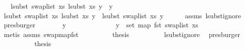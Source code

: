 \begin{isabellebody}
\ \ \ {\isachardoublequoteopen}lsubst\ {\isacharparenleft}{\kern0pt}swap{\isacharunderscore}{\kern0pt}list\ xs{\isacharparenright}{\kern0pt}\ {\isacharparenleft}{\kern0pt}lsubst\ xs\ y{\isacharparenright}{\kern0pt}\ {\isacharequal}{\kern0pt}\ y{\isachardoublequoteclose}\isanewline
%
\isadelimproof
%
\endisadelimproof
%
\isatagproof
{}\isamarkupfalse%
\ {\isacharminus}{\kern0pt}\isanewline
\ \ \isamarkupfalse%
\ {\isachardoublequoteopen}lsubst\ {\isacharparenleft}{\kern0pt}swap{\isacharunderscore}{\kern0pt}list\ xs{\isacharparenright}{\kern0pt}\ {\isacharparenleft}{\kern0pt}lsubst\ xs\ y{\isacharparenright}{\kern0pt}\ {\isacharequal}{\kern0pt}\ lsubst\ {\isacharparenleft}{\kern0pt}swap{\isacharunderscore}{\kern0pt}list\ xs{\isacharparenright}{\kern0pt}\ y{\isachardoublequoteclose}\isanewline
\ \ \ \ \isamarkupfalse%
\ assms{\isacharparenleft}{\kern0pt}{}{\isacharparenright}{\kern0pt}\ lsubst{\isacharunderscore}{\kern0pt}ignore\ \isamarkupfalse%
\ presburger\isanewline
\ \ \isamarkupfalse%
\ \isamarkupfalse%
\ {\isachardoublequoteopen}{\isachardot}{\kern0pt}{\isachardot}{\kern0pt}{\isachardot}{\kern0pt}\ {\isacharequal}{\kern0pt}\ y{\isachardoublequoteclose}\isanewline
\ \ \ \ \isamarkupfalse%
\ {\isacharminus}{\kern0pt}\isanewline
\ \ \ \ \ \ \isamarkupfalse%
\ {\isachardoublequoteopen}y\ {\isasymnotin}\ set\ {\isacharparenleft}{\kern0pt}map\ fst\ {\isacharparenleft}{\kern0pt}swap{\isacharunderscore}{\kern0pt}list\ xs{\isacharparenright}{\kern0pt}{\isacharparenright}{\kern0pt}{\isachardoublequoteclose}\isanewline
\ \ \ \ \ \ \ \ \isamarkupfalse%
\ {\isacharparenleft}{\kern0pt}metis\ assms{\isacharparenleft}{\kern0pt}{}{\isacharparenright}{\kern0pt}\ swap{\isacharunderscore}{\kern0pt}map{\isacharunderscore}{\kern0pt}fst{\isacharparenright}{\kern0pt}\isanewline
\ \ \ \ \ \ \isamarkupfalse%
\ \isamarkupfalse%
\ {\isacharquery}{\kern0pt}thesis\isanewline
\ \ \ \ \ \ \ \ \isamarkupfalse%
\ lsubst{\isacharunderscore}{\kern0pt}ignore\ \isamarkupfalse%
\ presburger\isanewline
\ \ \ \ \isamarkupfalse%
\isanewline
\ \ \isamarkupfalse%
\ \isamarkupfalse%
\ {\isacharquery}{\kern0pt}thesis\ \isakeywordONE{{\isachardot}{\kern0pt}}\isamarkupfalse%
\isanewline
{}\isamarkupfalse%
%
\endisatagproof

\end{isabellebody}
